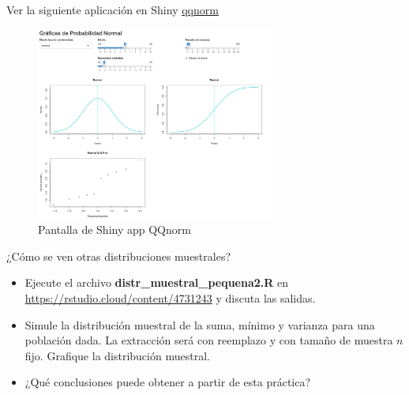 \documentclass[
  10pt,
  ignorenonframetext,
]{beamer}
\begin{document}
\begin{frame}{}
\protect\hypertarget{section-48}{}
Ver la siguiente aplicación en Shiny
\href{https://s3rgionava.shinyapps.io/QQnorm/?_ga=2.74771473.2040383487.1666298329-1276638344.1663958366}{qqnorm}

\begin{figure}
\centering
\includegraphics[width=0.7\textwidth,height=\textheight]{figuras/QQnorm.png}
\caption{Pantalla de Shiny app QQnorm}
\end{figure}
\end{frame}

\begin{frame}{}
\protect\hypertarget{section-49}{}
\begin{block}{¿Cómo se ven otras distribuciones muestrales?}
\protect\hypertarget{cuxf3mo-se-ven-otras-distribuciones-muestrales}{}
\begin{itemize}
\item
  Ejecute el archivo \textbf{distr\_muestral\_pequena2.R} en
  \url{https://rstudio.cloud/content/4731243} y discuta las salidas.
\item
  Simule la distribución muestral de la suma, mínimo y varianza para una
  población dada. La extracción será con reemplazo y con tamaño de
  muestra \(n\) fijo. Grafique la distribución muestral.
\item
  ¿Qué conclusiones puede obtener a partir de esta práctica?
\end{itemize}
\end{block}
\end{frame}
\end{document}
